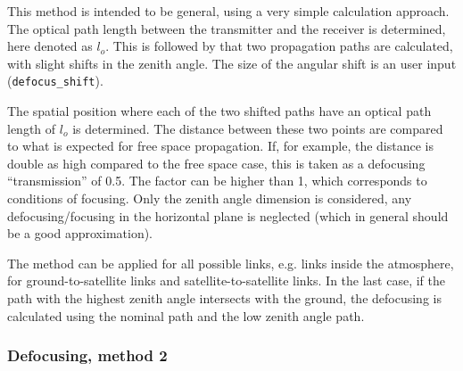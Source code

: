 This method is intended to be general, using a very simple calculation
approach. The optical path length between the transmitter and the receiver is
determined, here denoted as $l_o$. This is followed by that two propagation
paths are calculated, with slight shifts in the zenith angle. The size of the
angular shift is an user input (\texttt{defocus\_shift}).

The spatial position where each of the two shifted paths have an optical path
length of $l_o$ is determined. The distance between these two points are
compared to what is expected for free space propagation. If, for example, the
distance is double as high compared to the free space case, this is taken as a
defocusing ``transmission'' of 0.5. The factor can be higher than 1, which
corresponds to conditions of focusing. Only the zenith angle dimension is
considered, any defocusing/focusing in the horizontal plane is neglected (which
in general should be a good approximation). 

The method can be applied for all possible links, e.g. links inside the
atmosphere, for ground-to-satellite links and satellite-to-satellite links. In
the last case, if the path with the highest zenith angle intersects with the
ground, the defocusing is calculated using the nominal path and the low zenith
angle path.


\subsubsection{Defocusing, method 2}
\label{sec:rlink:defocm2}

